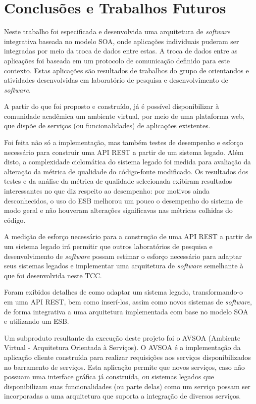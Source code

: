\chapter[Conclusões e Trabalhos Futuros]{Conclusões e Trabalhos Futuros}

Neste trabalho foi especificada e desenvolvida uma arquitetura de \textit{software} integrativa baseada no modelo SOA, onde aplicações individuais puderam ser integradas por meio da troca de dados entre estas. A troca de dados entre as aplicações foi baseada em um protocolo de comunicação definido para este contexto. Estas aplicações são resultados de trabalhos do grupo de orientandos e atividades desenvolvidas em laboratório de pesquisa e desenvolvimento de \textit{software}.

A partir do que foi proposto e construído, já é possível disponibilizar à comunidade acadêmica um ambiente virtual, por meio de uma plataforma web, que dispõe de serviços (ou funcionalidades) de aplicações existentes.

Foi feita não só a implementação, mas também testes de desempenho e esforço necessário para construir uma API REST a partir de um sistema legado. Além disto, a complexidade ciclomática do sistema legado foi medida para avaliação da alteração da métrica de qualidade do código-fonte modificado. Os resultados dos testes e da análise da métrica de qualidade selecionada exibiram resultados interessantes no que diz respeito ao desempenho: por motivos ainda desconhecidos, o uso do ESB melhorou um pouco o desempenho do sistema de modo geral e não houveram alterações significavas nas métricas colhidas do código.

A medição de esforço necessário para a construção de uma API REST a partir de um sistema legado irá permitir que outros laboratórios de pesquisa e desenvolvimento de \textit{software} possam estimar o esforço necessário para adaptar seus sistemas legados e implementar uma arquitetura de \textit{software} semelhante à que foi desenvolvida neste TCC.

Foram exibidos detalhes de como adaptar um sistema legado, transformando-o em uma API REST, bem como inserí-los, assim como novos sistemas de \textit{software}, de forma integrativa a uma arquitetura implementada com base no modelo SOA e utilizando um ESB.

Um subproduto resultante da execução deste projeto foi o AVSOA (Ambiente Virtual - Arquitetura Orientada à Serviços). O AVSOA é a implementação da aplicação cliente construída para realizar requisições aos serviços disponibilizados no barramento de serviços. Esta aplicação permite que novos serviços, caso não possuam uma interface gráfica já construída, ou sistemas legados que disponibilizam suas funcionalidades (ou parte delas) como um serviço possam ser incorporadas a uma arquitetura que suporta a integração de diversos serviços.

